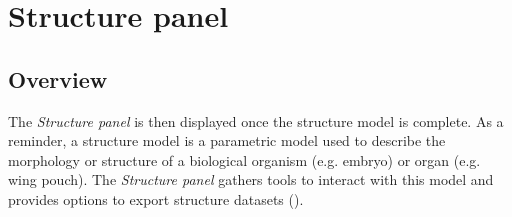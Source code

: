 

\section{Structure panel}\label{sec:structure_panel}
\subsection{Overview}
The \emph{Structure panel} is then displayed once the structure model is complete. As a reminder, a structure model is a parametric model used to describe the morphology or structure of a biological organism (e.g. \droso embryo) or organ (e.g. \droso wing pouch). The \emph{Structure panel} gathers tools to interact with this model and provides options to export structure datasets ().

